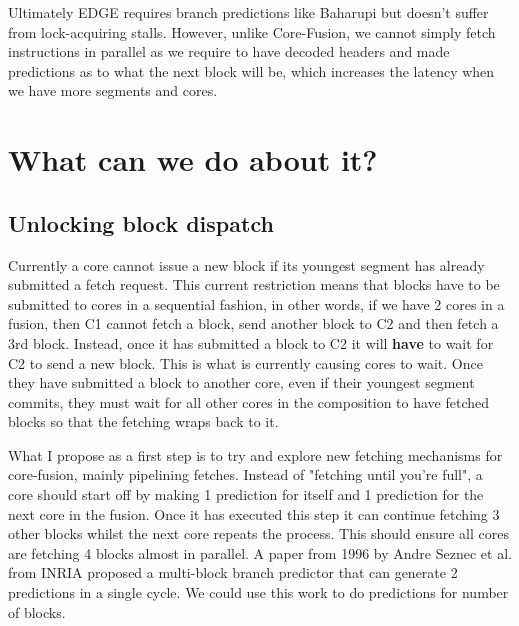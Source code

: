 Ultimately EDGE requires branch predictions like Baharupi but doesn't suffer from lock-acquiring stalls.
However, unlike Core-Fusion, we cannot simply fetch instructions in parallel as we require to have decoded headers and made predictions as to what the next block will be, which increases the latency when we have more segments and cores.

\section{What can we do about it?}

\subsection{Unlocking block dispatch}

Currently a core cannot issue a new block if its youngest segment has already submitted a fetch request.
This current restriction means that blocks have to be submitted to cores in a sequential fashion, in other words, if we have 2 cores in a fusion, then C1 cannot fetch a block, send another block to C2 and then fetch a 3rd block. Instead, once it has submitted a block to C2 it will \textbf{have} to wait for C2 to send a new block.
This is what is currently causing cores to wait. Once they have submitted a block to another core, even if their youngest segment commits, they must wait for all other cores in the composition to have fetched blocks so that the fetching wraps back to it.

What I propose as a first step is to try and explore new fetching mechanisms for core-fusion, mainly pipelining fetches.
Instead of "fetching until you're full", a core should start off by making 1 prediction for itself and 1 prediction for the next core in the fusion.
Once it has executed this step it can continue fetching 3 other blocks whilst the next core repeats the process.
This should ensure all cores are fetching 4 blocks almost in parallel.
A paper from 1996 by Andre Seznec et al. from INRIA proposed a multi-block branch predictor that can generate 2 predictions in a single cycle.
We could use this work to do predictions for number of blocks.


